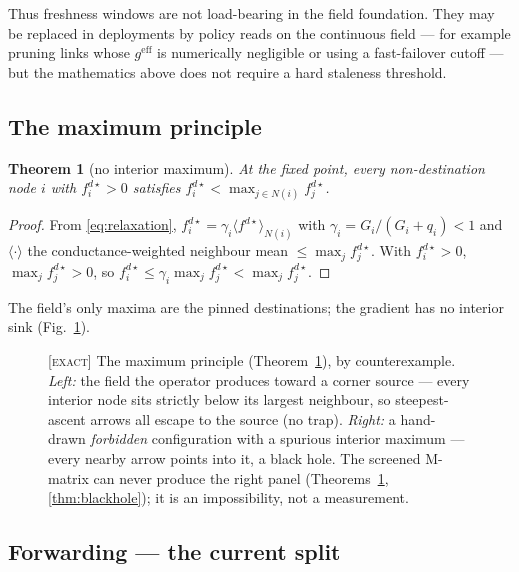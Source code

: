 \documentclass[11pt]{article}
\theoremstyle{plain}
\newtheorem{theorem}{Theorem}[section]
\numberwithin{equation}{section}
\begin{document}
Thus freshness windows are not load-bearing in the field foundation. They may be replaced in deployments by policy reads on the continuous field — for example pruning links whose $g^{\mathrm{eff}}$ is numerically negligible or using a fast-failover cutoff — but the mathematics above does not require a hard staleness threshold.

\subsection{The maximum principle}\label{sec:max-principle}

\begin{theorem}[no interior maximum]\label{thm:maxprinciple}
At the fixed point, every non-destination node $i$ with $f^{d\star}_i>0$ satisfies $f^{d\star}_i<\max_{j\in N(i)}f^{d\star}_j$.
\end{theorem}
\begin{proof}
From \eqref{eq:relaxation}, $f^{d\star}_i=\gamma_i\langle f^{d\star}\rangle_{N(i)}$ with $\gamma_i=G_i/(G_i+q_i)<1$ and $\langle\cdot\rangle$ the conductance-weighted neighbour mean $\le\max_j f^{d\star}_j$. With $f^{d\star}_i>0$, $\max_j f^{d\star}_j>0$, so $f^{d\star}_i\le\gamma_i\max_j f^{d\star}_j<\max_j f^{d\star}_j$.
\end{proof}

The field's only maxima are the pinned destinations; the gradient has no interior sink (Fig.~\ref{fig:maxprinciple}).

\begin{figure}[tbp]
\centering

\caption{\textsc{[exact]} The maximum principle (Theorem~\ref{thm:maxprinciple}), by counterexample. \emph{Left:} the field the operator produces toward a corner source — every interior node sits strictly below its largest neighbour, so steepest-ascent arrows all escape to the source (no trap). \emph{Right:} a hand-drawn \emph{forbidden} configuration with a spurious interior maximum — every nearby arrow points into it, a black hole. The screened M-matrix can never produce the right panel (Theorems~\ref{thm:maxprinciple}, \ref{thm:blackhole}); it is an impossibility, not a measurement.}
\label{fig:maxprinciple}
\end{figure}

\subsection{Forwarding — the current split}\label{sec:forwarding}
\end{document}
